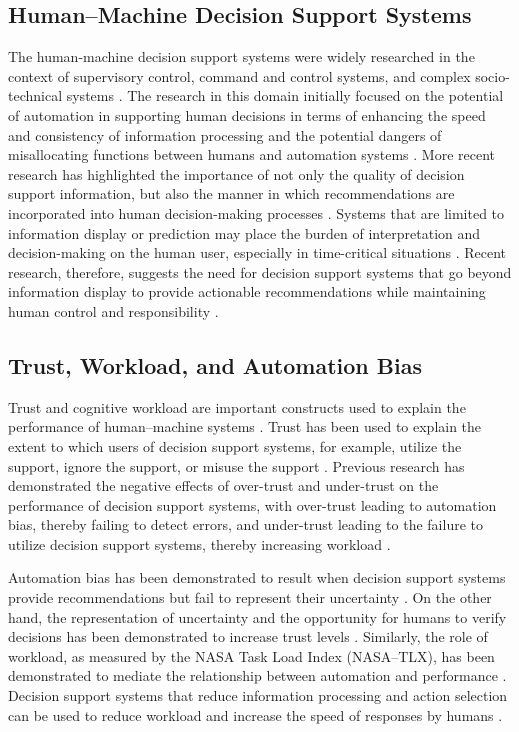 \documentclass[journal]{IEEEtran}
\theoremstyle{plain}
\theoremstyle{definition}
\begin{document}
\subsection{Human--Machine Decision Support Systems}
The human-machine decision support systems were widely researched in the context of supervisory control, command and control systems, and complex socio-technical systems \cite{Hodgson2013THMS,Yang2022THMSReview,Bach2024Access}. The research in this domain initially focused on the potential of automation in supporting human decisions in terms of enhancing the speed and consistency of information processing and the potential dangers of misallocating functions between humans and automation systems \cite{Hodgson2013THMS,Zhang2022THMS}.
More recent research has highlighted the importance of not only the quality of decision support information, but also the manner in which recommendations are incorporated into human decision-making processes \cite{Lai2023FAccT,Muller2022CHIWORK}. Systems that are limited to information display or prediction may place the burden of interpretation and decision-making on the human user, especially in time-critical situations \cite{Bach2024Access,PerezCerrolaza2024CSUR}. Recent research, therefore, suggests the need for decision support systems that go beyond information display to provide actionable recommendations while maintaining human control and responsibility \cite{Assaad2023TAS,Yang2022THMSReview}.

\subsection{Trust, Workload, and Automation Bias}
Trust and cognitive workload are important constructs used to explain the performance of human--machine systems \cite{Hodgson2013THMS,Bach2024Access}. Trust has been used to explain the extent to which users of decision support systems, for example, utilize the support, ignore the support, or misuse the support \cite{Lai2023FAccT,Yang2022THMSReview}. Previous research has demonstrated the negative effects of over-trust and under-trust on the performance of decision support systems, with over-trust leading to automation bias, thereby failing to detect errors, and under-trust leading to the failure to utilize decision support systems, thereby increasing workload \cite{Raji2019AIES,Raji2022CACM}.

Automation bias has been demonstrated to result when decision support systems provide recommendations but fail to represent their uncertainty \cite{Raji2019AIES,Weidinger2022FAccT}. On the other hand, the representation of uncertainty and the opportunity for humans to verify decisions has been demonstrated to increase trust levels \cite{Miller2019XRDS,Bach2024Access}. Similarly, the role of workload, as measured by the NASA Task Load Index (NASA--TLX), has been demonstrated to mediate the relationship between automation and performance \cite{Hodgson2013THMS,Yang2022THMSReview}. Decision support systems that reduce information processing and action selection can be used to reduce workload and increase the speed of responses by humans \cite{Lai2023FAccT,Muller2022CHIWORK}.
\end{document}

